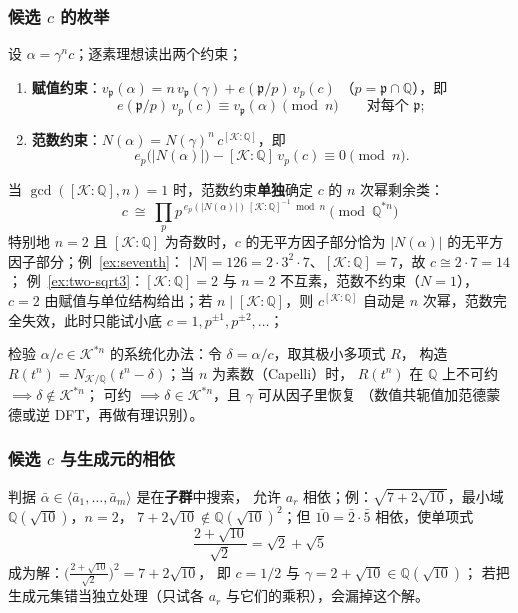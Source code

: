 \documentclass[UTF8,a4paper,11pt]{ctexart}
\begin{document}
\subsubsection{候选 $c$ 的枚举}

设 $\alpha=\gamma^n c$；逐素理想读出两个约束；\par

\begin{enumerate}
\item \textbf{赋值约束}：$v_{\mathfrak{p}}(\alpha)=n\,v_{\mathfrak{p}}(\gamma)+e(\mathfrak{p}/p)\,v_p(c)$
（$p=\mathfrak{p}\cap\mathbb{Q}$），即
\[
e(\mathfrak{p}/p)\,v_p(c)\equiv v_{\mathfrak{p}}(\alpha)\pmod n
\qquad\text{对每个 }\mathfrak{p};
\]
\item \textbf{范数约束}：$N(\alpha)=N(\gamma)^n\,c^{[\mathscr{K}:\mathbb{Q}]}$，即
\[
e_p\bigl(|N(\alpha)|\bigr)-[\mathscr{K}:\mathbb{Q}]\,v_p(c)\equiv0\pmod n .
\]
\end{enumerate}

当 $\gcd([\mathscr{K}:\mathbb{Q}],n)=1$ 时，范数约束\textbf{单独}确定 $c$ 的 $n$ 次幂剩余类：
\[
\boxed{\ c\ \cong\ \prod_p p^{\,e_p(|N(\alpha)|)\,[\mathscr{K}:\mathbb{Q}]^{-1}\bmod n}
\pmod{\mathbb{Q}^{*n}}\ }
\]
特别地 $n=2$ 且 $[\mathscr{K}:\mathbb{Q}]$ 为奇数时，$c$ 的无平方因子部分恰为
$|N(\alpha)|$ 的无平方因子部分；例~\ref{ex:seventh}：
$|N|=126=2\cdot3^2\cdot7$、$[\mathscr{K}:\mathbb{Q}]=7$，故 $c\cong2\cdot7=14$；
例~\ref{ex:two-sqrt3}：$[\mathscr{K}:\mathbb{Q}]=2$ 与 $n=2$ 不互素，范数不约束（$N=1$），
$c=2$ 由赋值与单位结构给出；若 $n\mid[\mathscr{K}:\mathbb{Q}]$，则 $c^{[\mathscr{K}:\mathbb{Q}]}$
自动是 $n$ 次幂，范数完全失效，此时只能试小底 $c=1,p^{\pm1},p^{\pm2},\dots$；\par

检验 $\alpha/c\in\mathscr{K}^{*n}$ 的系统化办法：令 $\delta=\alpha/c$，取其极小多项式 $R$，
构造 $R(t^n)=N_{\mathscr{K}/\mathbb{Q}}(t^n-\delta)$；当 $n$ 为素数（Capelli）时，
$R(t^n)$ 在 $\mathbb{Q}$ 上不可约 $\implies\delta\notin\mathscr{K}^{*n}$；
可约 $\implies\delta\in\mathscr{K}^{*n}$，且 $\gamma$ 可从因子里恢复
（数值共轭值加范德蒙德或逆 DFT，再做有理识别）。\par

\subsubsection{候选 $c$ 与生成元的相依}

判据 $\bar\alpha\in\langle\bar a_1,\dots,\bar a_m\rangle$ 是在\textbf{子群}中搜索，
允许 $a_r$ 相依；例：$\sqrt{7+2\sqrt{10}}$，最小域 $\mathbb{Q}(\sqrt{10})$，$n=2$，
$7+2\sqrt{10}\notin\mathbb{Q}(\sqrt{10})^2$；但 $\bar{10}=\bar2\cdot\bar5$ 相依，使单项式
\[
\frac{2+\sqrt{10}}{\sqrt2}=\sqrt2+\sqrt5
\]
成为解：$\bigl(\frac{2+\sqrt{10}}{\sqrt2}\bigr)^2=7+2\sqrt{10}$，
即 $c=1/2$ 与 $\gamma=2+\sqrt{10}\in\mathbb{Q}(\sqrt{10})$；
若把生成元集错当独立处理（只试各 $a_r$ 与它们的乘积），会漏掉这个解。
\end{document}
